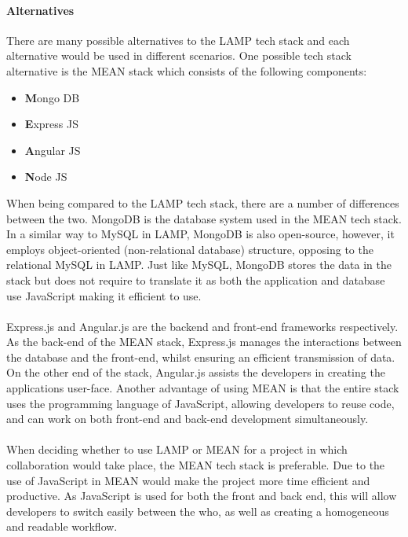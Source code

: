 \documentclass[a4paper, 11pt]{report}
\begin{document}
	\paragraph{Alternatives}
	There are many possible alternatives to the LAMP tech stack and each alternative would be used in different scenarios. One possible tech stack alternative is the MEAN stack which consists of the following components:
	\begin{itemize}
	    \item \textbf{M}ongo DB
	    \item \textbf{E}xpress JS
	    \item \textbf{A}ngular JS
	    \item \textbf{N}ode JS
	\end{itemize}
	When being compared to the LAMP tech stack, there are a number of differences between the two. MongoDB is the database system used in the MEAN tech stack. In a similar way to MySQL in LAMP, MongoDB is also open-source, however, it employs object-oriented (non-relational database) structure, opposing to the relational MySQL in LAMP. Just like MySQL, MongoDB stores the data in the stack but does not require to translate it as both the application and database use JavaScript making it efficient to use. 
	\\
	\\
	Express.js and Angular.js are the backend and front-end frameworks respectively. As the back-end of the MEAN stack, Express.js manages the interactions between the database and the front-end, whilst ensuring an efficient transmission of data. On the other end of the stack, Angular.js assists the developers in creating the applications user-face. 
	\noindent
	Another advantage of using MEAN is that the entire stack uses the programming language of JavaScript, allowing developers to reuse code, and can work on both front-end and back-end development simultaneously. 
	\\
	\\
	When deciding whether to use LAMP or MEAN for a project in which collaboration would take place, the MEAN tech stack is preferable. Due to the use of JavaScript in MEAN would make the project more time efficient and productive. As JavaScript is used for both the front and back end, this will allow developers to switch easily between the who, as well as creating a homogeneous and readable workflow.
    \\
    \\
	\noindent
\end{document}
